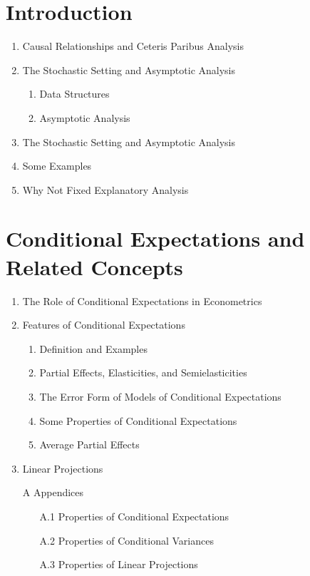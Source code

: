 \documentclass[11pt, oneside, a4paper, article]{article}
\numberwithin{equation}{section}
\begin{document}
\clearpage
\section{Introduction}
\noindent
\citet[C.1, pp. 3--9]{wool-2010} 

\begin{enumerate}[noitemsep, label*=1.\arabic*.]
\item  Causal Relationships and Ceteris Paribus Analysis

\item  The Stochastic Setting and Asymptotic Analysis
\begin{enumerate}[noitemsep, leftmargin=1 em, label*=\arabic*.]
\item Data Structures
\item Asymptotic Analysis
\end{enumerate}

\item  The Stochastic Setting and Asymptotic Analysis
\item  Some Examples
\item  Why Not Fixed Explanatory Analysis
\end{enumerate}

\clearpage
\section{Conditional Expectations and Related Concepts}
\noindent
\citet[C.2, pp. 13--34]{wool-2010} 

\begin{enumerate}[noitemsep, label*=2.\arabic*.]
\item  The Role of Conditional Expectations in Econometrics

\item  Features of Conditional Expectations
\begin{enumerate}[noitemsep, leftmargin=1 em, label*=\arabic*.]
\item Definition and Examples
\item Partial Effects, Elasticities, and Semielasticities
\item The Error Form of Models of Conditional Expectations
\item Some Properties of Conditional Expectations
\item Average Partial Effects
\end{enumerate}
\item  Linear Projections

\item[A]  Appendices

\begin{enumerate}[noitemsep]
\item[A.1] Properties of Conditional Expectations
\item[A.2] Properties of Conditional Variances
\item[A.3] Properties of Linear Projections
\end{enumerate}
\end{enumerate}
\end{document}

